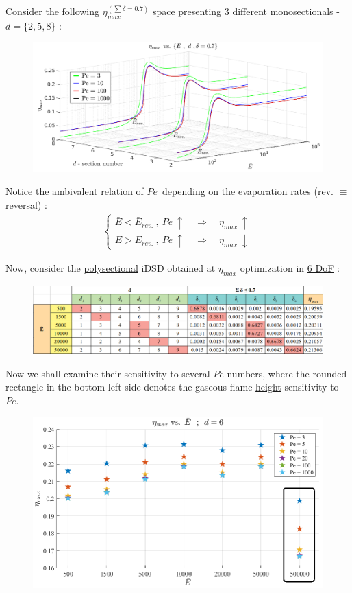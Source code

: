 \documentclass[12pt]{article}
\numberwithin{equation}{section}
\begin{document}
\begin{flushleft}
Consider the following $\eta_{max}^{(\sum \delta=0.7)}$ space presenting 3 different monosectionals - $d = \{2, 5, 8 \}$ :
\begin{figure}[H]
\centering
\includegraphics[width=1.1 \linewidth, center]{Eta_max_space.png}
\end{figure}
Notice the ambivalent relation of $Pe$\, depending on the evaporation rates (rev. $\equiv$ {reversal}) :
\begin{align*}
\begin{cases}
\bar{E} < \bar{E}_{rev.} \ , \ Pe \ \uparrow \quad \Rightarrow \quad \eta_{max} \ \uparrow  \\
\bar{E} > \bar{E}_{rev.} \ , \ Pe \ \uparrow \quad \Rightarrow \quad \eta_{max} \ \downarrow
\end{cases} 
\end{align*}

Now, consider the \underline{polysectional} iDSD obtained at \hyperref[eta_d_6]{$\eta_{max}$} optimization in \underline{6 DoF} :
\begin{figure}[H] \label{eta_Opt}
\centering
\includegraphics[width=1.0 \linewidth, center]{eta_d_07_c.png}
\end{figure}
Now we shall examine their sensitivity to several $Pe$ numbers, where the rounded rectangle in the bottom left side denotes the gaseous flame \underline{height} sensitivity to $Pe$.

\begin{figure}[H]
\centering
\includegraphics[width=.975 \linewidth, center]{eta_max_Pe_1.png}
\end{figure}


\end{flushleft}
\end{document}
